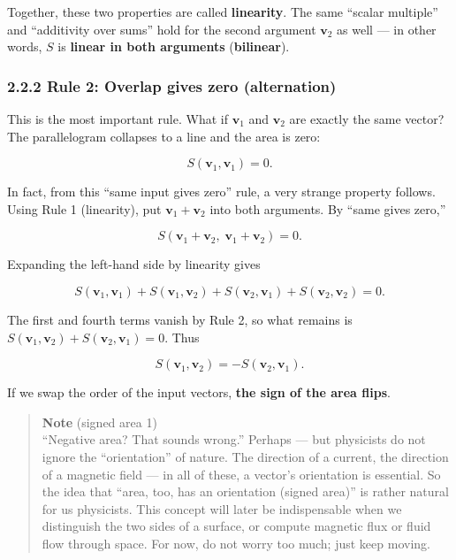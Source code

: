 Together, these two properties are called \textbf{linearity}. The same
``scalar multiple'' and ``additivity over sums'' hold for the second
argument \(\mathbf{v}_2\) as well --- in other words, \(S\) is
\textbf{linear in both arguments} (\textbf{bilinear}).

\hypertarget{rule-2-overlap-gives-zero-alternation}{%
\subsubsection{2.2.2 Rule 2: Overlap gives zero
(alternation)}\label{rule-2-overlap-gives-zero-alternation}}

This is the most important rule. What if \(\mathbf{v}_1\) and
\(\mathbf{v}_2\) are exactly the same vector? The parallelogram
collapses to a line and the area is zero:

\[S(\mathbf{v}_1,\mathbf{v}_1)=0.\]

In fact, from this ``same input gives zero'' rule, a very strange
property follows. Using Rule 1 (linearity), put
\(\mathbf{v}_1+\mathbf{v}_2\) into both arguments. By ``same gives
zero,''

\[S(\mathbf{v}_1+\mathbf{v}_2,\;\mathbf{v}_1+\mathbf{v}_2)=0.\]

Expanding the left-hand side by linearity gives

\[S(\mathbf{v}_1,\mathbf{v}_1)+S(\mathbf{v}_1,\mathbf{v}_2)+S(\mathbf{v}_2,\mathbf{v}_1)+S(\mathbf{v}_2,\mathbf{v}_2)=0.\]

The first and fourth terms vanish by Rule 2, so what remains is
\(S(\mathbf{v}_1,\mathbf{v}_2)+S(\mathbf{v}_2,\mathbf{v}_1)=0\). Thus

\[S(\mathbf{v}_1,\mathbf{v}_2)=-S(\mathbf{v}_2,\mathbf{v}_1).\]

If we swap the order of the input vectors,
\textbf{the sign of the area flips}.

\begin{quote}
\textbf{Note} (signed area 1)\\
``Negative area? That sounds wrong.'' Perhaps --- but physicists do not
ignore the ``orientation'' of nature. The direction of a current, the
direction of a magnetic field --- in all of these, a vector's
orientation is essential. So the idea that ``area, too, has an
orientation (signed area)'' is rather natural for us physicists. This
concept will later be indispensable when we distinguish the two sides of
a surface, or compute magnetic flux or fluid flow through space. For
now, do not worry too much; just keep moving.
\end{quote}

